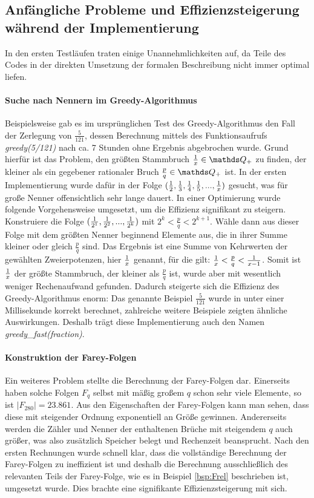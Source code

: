\subsection{Anfängliche Probleme und Effizienzsteigerung während der Implementierung}
In den ersten Testläufen traten einige Unannehmlichkeiten auf, da Teile des Codes in der direkten Umsetzung der formalen Beschreibung nicht immer optimal liefen.

\paragraph{Suche nach Nennern im Greedy-Algorithmus}Beispielsweise gab es im ursprünglichen Test des Greedy-Algorithmus den Fall der Zerlegung von $\frac{5}{121}$, dessen Berechnung mittels des Funktionsaufrufs \emph{greedy(5/121)} nach ca. 7 Stunden ohne Ergebnis abgebrochen wurde. Grund hierfür ist das Problem, den größten Stammbruch $\uf{x} \in \Q_+$ zu finden, der kleiner als ein gegebener rationaler Bruch $\frac{p}{q} \in \Q_+$ ist. In der ersten Implementierung wurde dafür in der Folge $(\frac{1}{2}, \frac{1}{3}, \frac{1}{4}, \frac{1}{5},...,\frac{1}{x})$ gesucht, was für große Nenner offensichtlich sehr lange dauert. In einer Optimierung wurde folgende Vorgehensweise umgesetzt, um die Effizienz signifikant zu steigern. Konstruiere die Folge $(\frac{1}{2^1}, \frac{1}{2^2}, ..., \frac{1}{2^k})$ mit $2^k < \frac{p}{q} < 2^{k+1}$. Wähle dann aus dieser Folge mit dem größten Nenner beginnend Elemente aus, die in ihrer Summe kleiner oder gleich $\frac{p}{q}$ sind. Das Ergebnis ist eine Summe von Kehrwerten der gewählten Zweierpotenzen, hier $\frac{1}{x}$ genannt, für die gilt: $\frac{1}{x} < \frac{p}{q} < \frac{1}{x-1}$. Somit ist $\frac{1}{x}$ der größte Stammbruch, der kleiner als $\frac{p}{q}$ ist, wurde aber mit wesentlich weniger Rechenaufwand gefunden.
Dadurch steigerte sich die Effizienz des Greedy-Algorithmus enorm: Das genannte Beispiel $\frac{5}{121}$ wurde in unter einer Millisekunde korrekt berechnet, zahlreiche weitere Beispiele zeigten ähnliche Auswirkungen. Deshalb trägt diese Implementierung auch den Namen \emph{greedy\_fast(fraction)}.

\paragraph{Konstruktion der Farey-Folgen}Ein weiteres Problem stellte die Berechnung der Farey-Folgen dar. Einerseits haben solche Folgen $F_q$ selbst mit mäßig großem $q$ schon sehr viele Elemente, so ist \zB $|F_{280}| = 23.861$. Aus den Eigenschaften der Farey-Folgen kann man sehen, dass diese mit steigender Ordnung exponentiell an Größe gewinnen. Andererseits werden die Zähler und Nenner der enthaltenen Brüche mit steigendem $q$ auch größer, was also zusätzlich Speicher belegt und Rechenzeit beansprucht. Nach den ersten Rechnungen wurde schnell klar, dass die vollständige Berechnung der Farey-Folgen zu ineffizient ist und deshalb die Berechnung ausschließlich des relevanten Teils der Farey-Folge, wie es in Beispiel \ref{bsp:Frel} beschrieben ist, umgesetzt wurde. Dies brachte eine signifikante Effizienzsteigerung mit sich.


